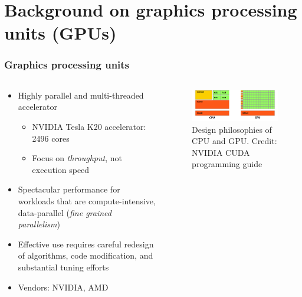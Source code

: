 \section{Background on graphics processing units (GPUs)}

\begin{frame}[t]
\frametitle{Graphics processing units}
\begin{columns}[T]
\begin{column}{0.5\textwidth}
\begin{itemize}
\item Highly parallel and multi-threaded accelerator
    \begin{itemize}
        \item NVIDIA Tesla K20 accelerator: 2496 cores
        \item Focus on \emph{throughput}, not execution speed
    \end{itemize}
\item Spectacular performance for workloads that
    are compute-intensive, data-parallel
    (\emph{fine grained parallelism})
\item Effective use requires careful redesign
    of algorithms, code modification,
    and substantial tuning efforts
\item Vendors: NVIDIA, AMD
\end{itemize}
\end{column}
\begin{column}{0.5\textwidth}
\begin{figure}
\begin{center}
\includegraphics[width=150px]{img/device-comparison.png}
\caption{Design philosophies of CPU and GPU.\newline
Credit: NVIDIA CUDA programming guide}
\centering
\end{center}
\end{figure}
\end{column}
\end{columns}
\end{frame}


